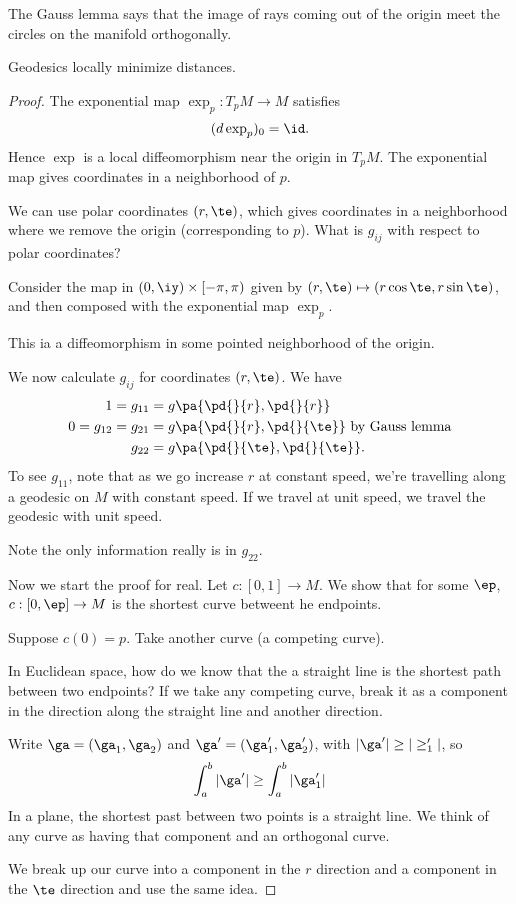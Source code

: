 The Gauss lemma says that the image of rays coming out of the origin meet the circles on the manifold orthogonally.


\begin{thm}
Geodesics locally minimize distances.
\end{thm}
\begin{proof}
The exponential map $\exp_p:T_pM\to M$  satisfies
\[
(d\exp_p)_0=\id.
\]
Hence $\exp$ is a local diffeomorphism near the origin in $T_pM$. The exponential map gives coordinates in a neighborhood of $p$. 

We can use polar coordinates $(r,\te)$, which gives coordinates in a neighborhood where we remove the origin (corresponding to $p$). What is $g_{ij}$ with respect to polar coordinates?

Consider the map in $(0,\iy)\times [-\pi, \pi)$ given by $(r,\te)\mapsto (r\cos \te,r\sin \te)$, and then composed with the exponential map $\exp_p$.


This ia a diffeomorphism in some pointed neighborhood of the origin.


We now calculate $g_{ij}$ for coordinates $(r,\te)$. We have
\begin{align*}
1=g_{11} &= g\pa{\pd{}{r},\pd{}{r}}\\
0=g_{12} =g_{21} &=g\pa{\pd{}{r},\pd{}{\te}}\text{ by Gauss lemma}\\
g_{22}&=g\pa{\pd{}{\te},\pd{}{\te}}.
\end{align*}
To see $g_{11}$, note that as we go increase $r$ at constant speed, we're travelling along a geodesic on $M$ with constant speed. If we travel at unit speed, we travel the geodesic with unit speed.

Note the only information really is in $g_{22}$.

Now we start the proof for real. Let $c:[0,1]\to M$. We show that for some $\ep$, $c:[0,\ep]\to M$ is the shortest curve betweent he endpoints.

Suppose $c(0)=p$. Take another curve (a competing curve).

In Euclidean space, how do we know that the a straight line is the shortest path between two endpoints? If we take any competing curve, break it as a component in the direction along the straight line and another direction. 


Write $\ga= (\ga_1,\ga_2)$ and $\ga'=(\ga_1',\ga_2')$, with $|\ga'|\ge|\ge_1'|$, so
\[
\int_a^b|\ga'|\ge \int_a^b|\ga_1'|
\]
In a plane, the shortest past between two points is a straight line. We think of any curve as having that component and an orthogonal curve.

We break up our curve into a component in the $r$ direction and a component in the $\te$ direction and use the same idea. %
\end{proof}